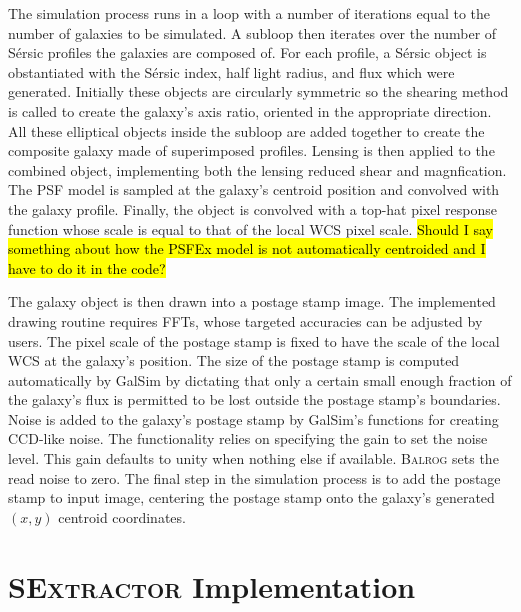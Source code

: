 \documentclass[12pt]{book}
\newcommand{\galsim}{GalSim}
\newcommand{\balrog}{\textsc{Balrog}}
\newcommand{\sex}{\textsc{SExtractor}}
\newcommand{\sersic}{S\'{e}rsic}
\begin{document}
The simulation process runs in a loop with a number of iterations equal to the number of galaxies to be simulated.
A subloop then iterates over the number of \sersic{} profiles the galaxies are composed of.
For each profile, a \sersic{} object is obstantiated with the \sersic{} index,
half light radius, and flux which were generated. Initially these objects are circularly symmetric
so the shearing method is called to create the galaxy's axis ratio, oriented in the appropriate direction.
All these elliptical objects inside the subloop are added together to create the composite galaxy made
of superimposed profiles. Lensing is then applied to the combined object, implementing both the
lensing reduced shear and magnfication.
The PSF model is sampled at the galaxy's centroid position and convolved with the galaxy profile.
Finally, the object is convolved with a top-hat pixel response function
whose scale is equal to that of the local WCS pixel scale.
\hl{Should I say something about how the PSFEx model is not automatically centroided and I have to do it in the code?}

The galaxy object is then drawn into a postage stamp image. 
The implemented drawing routine requires FFTs, whose targeted accuracies can be adjusted by users.
The pixel scale of the postage stamp is fixed to have the scale of the local WCS at the galaxy's position.
The size of the postage stamp is computed automatically by \galsim{} by dictating that
only a certain small enough fraction of the galaxy's flux is permitted to be lost outside the postage stamp's boundaries.
Noise is added to the galaxy's postage stamp by \galsim{}'s functions  for creating CCD-like noise.
The functionality relies on specifying the gain to set the noise level. 
This gain defaults to unity when nothing else if available.
\balrog{} sets the read noise to zero.
The final step in the simulation process is to add the postage stamp to input image, centering the
postage stamp onto the galaxy's generated $(x, y)$ centroid coordinates.


\section{\sex{} Implementation}
\label{sec:processing}
\end{document}

